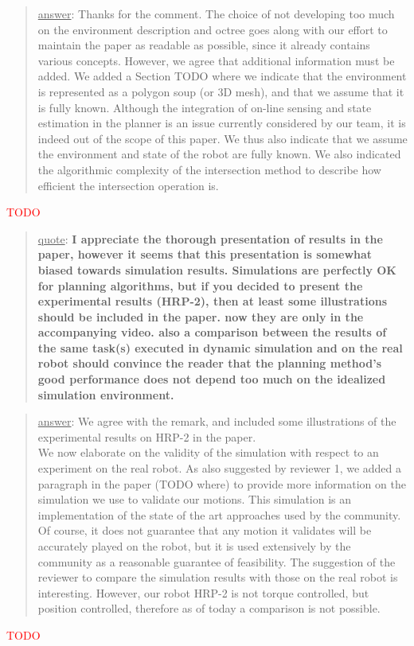 \documentclass[a4paper]{article}
\newcommand{\ndone}[0]{\textcolor{red}{TODO}}
\newcommand\quot[1]{\begin{quote} \underline{quote}: \textbf{#1}\end{quote}}
\newcommand\as[1]{\begin{quote} \underline{answer}: {#1}\end{quote} }
\begin{document}
\as{Thanks for the comment. The choice of not developing too much on the environment description and octree goes along with 
our effort to maintain the paper as readable as possible, since it already contains various concepts. However,
we agree that additional information must be added. We added a Section TODO where we indicate that the environment is represented as a polygon soup (or 3D mesh), and
that we assume that it is fully known. Although the integration of on-line sensing and state estimation in the planner is an issue currently considered by our team, it is indeed
out of the scope of this paper. We thus also indicate that we assume the environment and state of the robot are fully known. We also indicated the algorithmic complexity of the intersection
method to describe how efficient the intersection operation is.} \ndone

\quot{I appreciate the thorough presentation of results in the paper, however
it seems that this presentation is somewhat biased towards simulation
results. Simulations are perfectly OK for planning algorithms, but if
you decided to present the experimental results (HRP-2), then at least some
illustrations should be included in the paper. now they are only in the
accompanying video.  also a comparison between the results of the same
task(s) executed in dynamic simulation and on the real robot should
convince the reader that the planning method's good performance does
not depend too much on the idealized simulation environment. }
\as{We agree with the remark, and included some illustrations of the experimental results on HRP-2 in the paper. \\
We now elaborate on the validity of the simulation with respect to an experiment on the real robot. As also suggested by reviewer 1, we added a paragraph
in the paper (TODO where) to provide more information on the simulation we use to validate our motions. This simulation is an implementation of the state of the art approaches used by the community. Of course, it does not guarantee that any motion it validates will be accurately played on the robot, but it is used extensively by the community as a reasonable guarantee of feasibility.  The suggestion of the reviewer to compare the simulation results with those on the real robot is interesting. However, our robot HRP-2 is not torque controlled, but position controlled, therefore as of today a comparison is not possible.}\ndone
\end{document}
